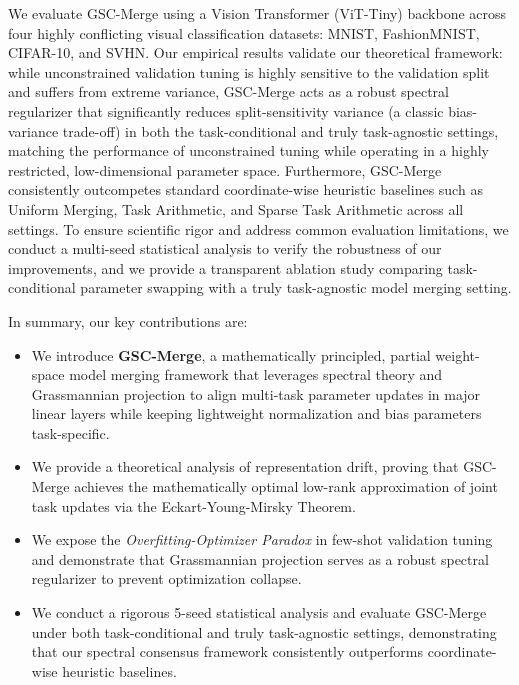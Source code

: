 We evaluate GSC-Merge using a Vision Transformer (ViT-Tiny) backbone across four highly conflicting visual classification datasets: MNIST, FashionMNIST, CIFAR-10, and SVHN. Our empirical results validate our theoretical framework: while unconstrained validation tuning is highly sensitive to the validation split and suffers from extreme variance, GSC-Merge acts as a robust spectral regularizer that significantly reduces split-sensitivity variance (a classic bias-variance trade-off) in both the task-conditional and truly task-agnostic settings, matching the performance of unconstrained tuning while operating in a highly restricted, low-dimensional parameter space. Furthermore, GSC-Merge consistently outcompetes standard coordinate-wise heuristic baselines such as Uniform Merging, Task Arithmetic, and Sparse Task Arithmetic across all settings. To ensure scientific rigor and address common evaluation limitations, we conduct a multi-seed statistical analysis to verify the robustness of our improvements, and we provide a transparent ablation study comparing task-conditional parameter swapping with a truly task-agnostic model merging setting.

In summary, our key contributions are:
\begin{itemize}
    \item We introduce \textbf{GSC-Merge}, a mathematically principled, partial weight-space model merging framework that leverages spectral theory and Grassmannian projection to align multi-task parameter updates in major linear layers while keeping lightweight normalization and bias parameters task-specific.
    \item We provide a theoretical analysis of representation drift, proving that GSC-Merge achieves the mathematically optimal low-rank approximation of joint task updates via the Eckart-Young-Mirsky Theorem.
    \item We expose the \emph{Overfitting-Optimizer Paradox} in few-shot validation tuning and demonstrate that Grassmannian projection serves as a robust spectral regularizer to prevent optimization collapse.
    \item We conduct a rigorous 5-seed statistical analysis and evaluate GSC-Merge under both task-conditional and truly task-agnostic settings, demonstrating that our spectral consensus framework consistently outperforms coordinate-wise heuristic baselines.
\end{itemize}
